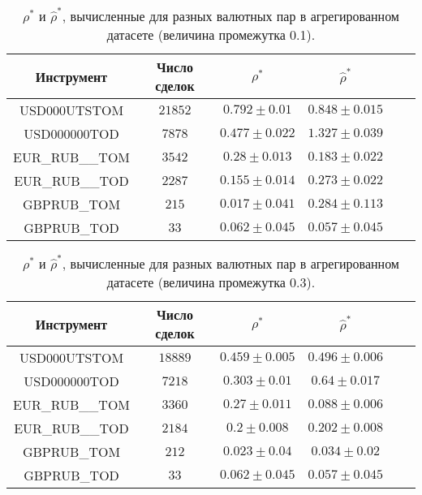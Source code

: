 \begin{table}[h!]
    \begin{center}
        \begin{tabular}{|c|c|c|c|c|c|}
            \hline
            Инструмент      & Число сделок & $\rho^*$ & $\hat \rho^*$            \\ \hline
            USD000UTSTOM    & $21852$      & $0.792 \pm 0.01$  & $0.848 \pm 0.015$ \\ \hline
            USD000000TOD    & $7878$       & $0.477 \pm 0.022$ & $1.327 \pm 0.039$ \\ \hline
            EUR\_RUB\_\_TOM & $3542$       & $0.28 \pm 0.013$  & $0.183 \pm 0.022$ \\ \hline
            EUR\_RUB\_\_TOD & $2287$       & $0.155 \pm 0.014$ & $0.273 \pm 0.022$ \\ \hline
            GBPRUB\_TOM     & $215$        & $0.017 \pm 0.041$ & $0.284 \pm 0.113$ \\ \hline
            GBPRUB\_TOD     & $33$         & $0.062 \pm 0.045$ & $0.057 \pm 0.045$ \\ \hline

        \end{tabular}
    \end{center}
    \caption{$\rho^*$ и $\hat \rho^*$, вычисленные для разных валютных пар в агрегированном датасете (величина промежутка 0.1).}
    \label{Aggreg1CU}
\end{table}
\begin{table}[h!]
    \begin{center}
        \begin{tabular}{|c|c|c|c|c|c|}
            \hline
            Инструмент      & Число сделок & $\rho^*$ & $\hat \rho^*$            \\ \hline
            USD000UTSTOM    & $18889$      & $0.459 \pm 0.005$ & $0.496 \pm 0.006$ \\ \hline
            USD000000TOD    & $7218$       & $0.303 \pm 0.01$  & $0.64 \pm 0.017$  \\ \hline
            EUR\_RUB\_\_TOM & $3360$       & $0.27 \pm 0.011$  & $0.088 \pm 0.006$ \\ \hline
            EUR\_RUB\_\_TOD & $2184$       & $0.2 \pm 0.008$   & $0.202 \pm 0.008$ \\ \hline
            GBPRUB\_TOM     & $212$        & $0.023 \pm 0.04$  & $0.034 \pm 0.02$  \\ \hline
            GBPRUB\_TOD     & $33$         & $0.062 \pm 0.045$ & $0.057 \pm 0.045$ \\ \hline

        \end{tabular}
    \end{center}
    \caption{$\rho^*$ и $\hat \rho^*$, вычисленные для разных валютных пар в агрегированном датасете (величина промежутка 0.3).}
    \label{Aggreg1CU}
\end{table}

